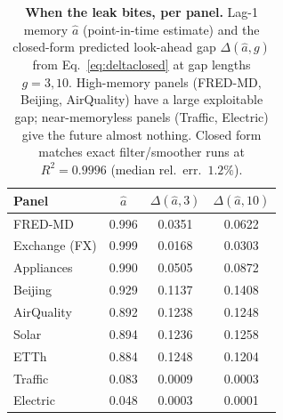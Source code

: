 \begin{table}[t]\centering\small
\setlength{\tabcolsep}{5pt}
\caption{\textbf{When the leak bites, per panel.} Lag-1 memory $\hat a$ (point-in-time estimate) and the closed-form predicted look-ahead gap $\Delta(\hat a,g)$ from Eq.~\eqref{eq:deltaclosed} at gap lengths $g{=}3,10$. High-memory panels (FRED-MD, Beijing, AirQuality) have a large exploitable gap; near-memoryless panels (Traffic, Electric) give the future almost nothing. Closed form matches exact filter/smoother runs at $R^2={0.9996}$ (median rel.\ err.\ ${1.2}\%$).}
\label{tab:gapband}
\begin{tabular}{@{}lccc@{}}
\toprule
Panel & $\hat a$ & $\Delta(\hat a,3)$ & $\Delta(\hat a,10)$ \\
\midrule
FRED-MD & 0.996 & 0.0351 & 0.0622 \\
Exchange (FX) & 0.999 & 0.0168 & 0.0303 \\
Appliances & 0.990 & 0.0505 & 0.0872 \\
Beijing & 0.929 & 0.1137 & 0.1408 \\
AirQuality & 0.892 & 0.1238 & 0.1248 \\
Solar & 0.894 & 0.1236 & 0.1258 \\
ETTh & 0.884 & 0.1248 & 0.1204 \\
Traffic & 0.083 & 0.0009 & 0.0003 \\
Electric & 0.048 & 0.0003 & 0.0001 \\
\bottomrule
\end{tabular}
\end{table}
